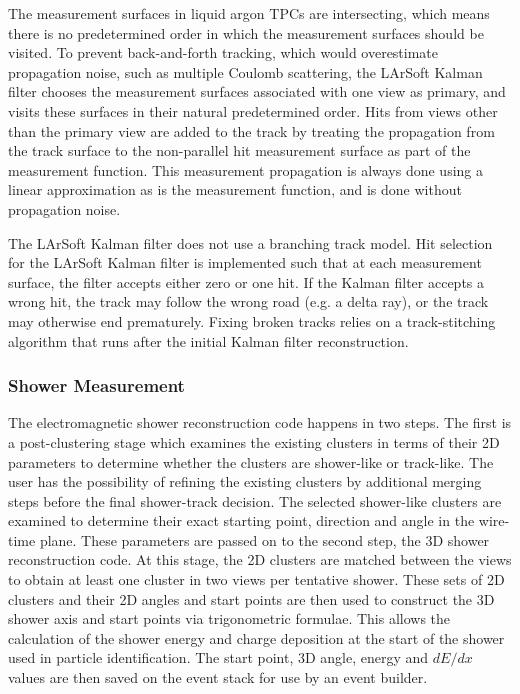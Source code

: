 The measurement surfaces in liquid argon TPCs are intersecting, which
means there is no predetermined order in which the measurement
surfaces should be visited.  To prevent back-and-forth tracking, which
would overestimate propagation noise, such as multiple Coulomb
scattering, the LArSoft Kalman filter chooses the measurement
surfaces associated with one view as primary, and visits these
surfaces in their natural predetermined order.  Hits from views other
than the primary view are added to the track by treating the
propagation from the track surface to the non-parallel hit measurement
surface as part of the measurement function.  This measurement
propagation is always done using a linear approximation as is the
measurement function, and is done without propagation noise.

The LArSoft Kalman filter does not use a branching track model. Hit
selection for the LArSoft Kalman filter is implemented such that at
each measurement surface, the filter accepts either zero or one
hit. If the Kalman filter accepts a wrong hit, the track may follow
the wrong road (e.g. a delta ray), or the track may otherwise end
prematurely.  Fixing broken tracks relies on a track-stitching
algorithm that runs after the initial Kalman filter reconstruction.

\subsubsection{Shower Measurement}


The electromagnetic shower reconstruction code happens in two
steps. The first is a post-clustering stage which examines the
existing clusters in terms of their 2D parameters to determine whether
the clusters are shower-like or track-like. The user has the
possibility of refining the existing clusters by additional merging
steps before the final shower-track decision. The selected shower-like
clusters are examined to determine their exact starting point,
direction and angle in the wire-time plane. These parameters are
passed on to the second step, the 3D shower reconstruction code. At
this stage, the 2D clusters are matched between the views to obtain at
least one cluster in two views per tentative shower. These sets of 2D
clusters and their 2D angles and start points are then used to
construct the 3D shower axis and start points via trigonometric
formulae. This allows the calculation of the shower energy and charge
deposition at the start of the shower used in particle
identification. The start point, 3D angle, energy and $dE/dx$ values
are then saved on the event stack for use by an event builder.

